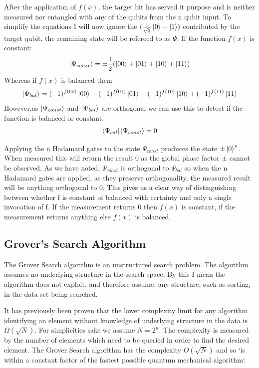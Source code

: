 \documentclass[authoryearcitations]{UoYCSproject}
\begin{document}
After the application of $f(x)$, the target bit has served it purpose and is neither measured nor entangled with any of the qubits from the n qubit input.
To simplify the equations I will now ignore the $(\frac{1}{\sqrt{2}}\left\vert{0}\right\rangle-\left\vert{1}\right\rangle)$ contributed by the target qubit, the remaining state will be refereed to as $\Psi$.
If the function $f(x)$ is constant:
\begin{equation*}
\left\vert{\Psi_{const}}\right\rangle=\pm\frac{1}{2}(\left\vert{00}\right\rangle+\left\vert{01}\right\rangle+\left\vert{10}\right\rangle+\left\vert{11}\right\rangle)
\end{equation*}
Whereas if $f(x)$ is balanced then:
\begin{equation*}
\left\vert{\Psi_{bal}}\right\rangle=(-1)^{f(00)}\left\vert{00}\right\rangle+(-1)^{f(01)}\left\vert{01}\right\rangle+(-1)^{f(10)}\left\vert{10}\right\rangle+(-1)^{f(11)}\left\vert{11}\right\rangle
\end{equation*}
However,as $\left\vert{\Psi_{const}}\right\rangle$ and $\left\vert{\Psi_{bal}}\right\rangle$ are orthogonal we can use this to detect if the function is balanced or constant.
\begin{equation*}
\left\langle{\Psi_{bal}}\right\vert\left\vert{\Psi_{const}}\right\rangle = 0
\end{equation*}

Applying the n Hadamard gates to the state $\Psi_{const}$ produces the state $\pm\left\vert{0}\right\rangle^n$.
When measured this will return the result $0$ as the global phase factor $\pm$ cannot be observed.
As we have noted, $\Psi_{const}$ is orthogonal to $\Psi_{bal}$ so when the n Hadamard gates are applied, as they preserve orthogonality, the measured result will be anything orthogonal to $0$.
This gives us a clear way of distinguishing between whether f is constant of balanced with certainty and only a single invocation of f.
If the measurement returns $0$ then $f(x)$ is constant, if the measurement returns anything else $f(x)$ is balanced.

\subsection{Grover's Search Algorithm}	
The Grover Search algorithm\cite{Grover:1996rk} is an unstructured search problem.
The algorithm assumes no underlying structure in the search space.
By this I mean the algorithm does not exploit, and therefore assume, any structure, such as sorting, in the data set being searched.

It has previously been proven\cite{Bennett:1996iu} that the lower complexity limit for any algorithm identifying an element without knowledge of underlying structure in the data is $\Omega(\sqrt{N})$.
For simplicities sake we assume $N=2^n$.
The complexity is measured by the number of elements which need to be queried in order to find the desired element.
The Grover Search algorithm has the complexity $O(\sqrt{N})$ and so `is within a constant factor of the fastest possible quantum mechanical algorithm`\cite{Grover:1996rk}.
\end{document}
